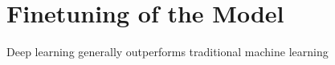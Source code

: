 

\section{Finetuning of the Model}
Deep learning generally outperforms traditional machine learning
\cite{ml_comparison}




